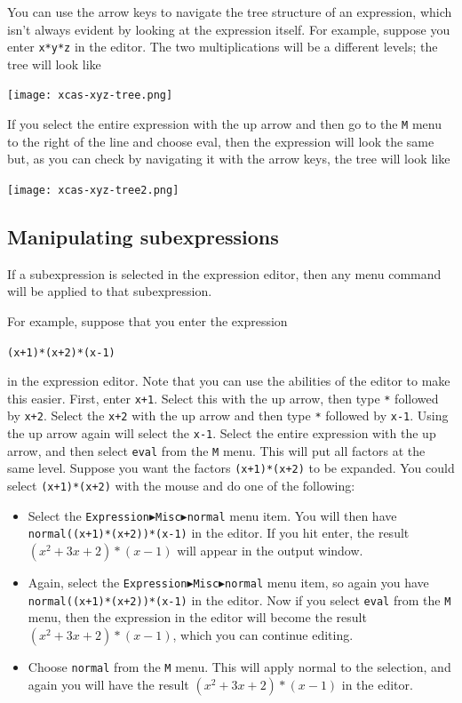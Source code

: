 \documentclass[a4paper,11pt]{book}
\begin{document}
You can use the arrow keys to navigate the tree structure of an
expression, which isn't always evident by looking at the expression
itself.  For example, suppose you enter \texttt{x*y*z} in the editor.
The two multiplications will be a different levels; the tree will look
like
\begin{center}
  \texttt{[image: xcas-xyz-tree.png]}
\end{center}
If you select the entire expression with the up arrow and then go to
the \texttt{M} menu to the right of the line and choose eval, then the
expression will look the same but, as you can check by navigating it
with the arrow keys, the tree will look like
\begin{center}
  \texttt{[image: xcas-xyz-tree2.png]}
\end{center}

\subsection{Manipulating subexpressions}

If a subexpression is selected in the expression editor, then any menu
command will be applied to that subexpression.  

For example, suppose that you enter the expression
\begin{center}
  {\tt (x+1)*(x+2)*(x-1)}
\end{center}
in the expression editor.  Note that you can use the abilities of the
editor to make this easier.  First, enter \texttt{x+1}.  Select this
with the up arrow, then type \texttt{*} followed by \texttt{x+2}.  Select
the \texttt{x+2} with the up arrow and then type \texttt{*} followed
by \texttt{x-1}.  Using the up arrow again will select the \texttt{x-1}.
Select the entire expression with the up arrow, and then select
\texttt{eval} from the \texttt{M} menu.  This will put all factors at
the same level.  Suppose you want the factors \texttt{(x+1)*(x+2)} to
be expanded.  You could select \texttt{(x+1)*(x+2)} with the mouse and
do one of the following:
\begin{itemize}
  \item
  Select the
  \texttt{Expression$\blacktriangleright$Misc$\blacktriangleright$normal}
  menu item.  You will then have \texttt{normal((x+1)*(x+2))*(x-1)} in
  the editor.  If you hit enter, the result $(x^2 + 3x + 2)*(x-1)$ will
  appear in the output window.
  \item
  Again, select the   
  \texttt{Expression$\blacktriangleright$Misc$\blacktriangleright$normal}
  menu item, so again you have \texttt{normal((x+1)*(x+2))*(x-1)} in
  the editor.  Now if you select \texttt{eval} from the \texttt{M}
  menu, then the expression in the editor will become the result
  $(x^2 + 3x + 2)*(x-1)$, which you can continue editing.
  \item
  Choose \texttt{normal} from the \texttt{M} menu.  This will apply
  normal to the selection, and again you will have the result
  $(x^2 + 3x + 2)*(x-1)$ in the editor.
\end{itemize}
\end{document}
